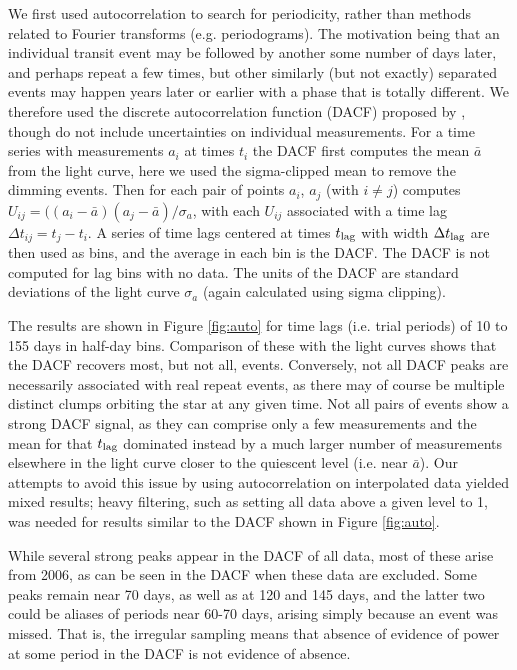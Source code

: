 \documentclass[]{rsos}
\begin{document}
We first used autocorrelation to search for periodicity, rather than methods related to
Fourier transforms (e.g. periodograms). The motivation being that an individual transit
event may be followed by another some number of days later, and perhaps repeat a few
times, but other similarly (but not exactly) separated events may happen years later or
earlier with a phase that is totally different. We therefore used the discrete
autocorrelation function (DACF) proposed by \cite{1988ApJ...333..646E}, though do not
include uncertainties on individual measurements. For a time series with measurements
$a_i$ at times $t_i$ the DACF first computes the mean $\bar{a}$ from the light curve,
here we used the sigma-clipped mean to remove the dimming events. Then for each pair of
points $a_i$, $a_j$ (with $i\ne j$) computes
$U_{ij}=((a_i-\bar{a})(a_j-\bar{a}) / \sigma_a$, with each $U_{ij}$ associated with a
time lag $\Delta t_{ij}=t_j - t_i$. A series of time lags centered at times $t_{\rm lag}$
with width $\Delta t_{\rm lag}$ are then used as bins, and the average in each bin is the
DACF. The DACF is not computed for lag bins with no data. The units of the DACF are
standard deviations of the light curve $\sigma_a$ (again calculated using sigma
clipping).

The results are shown in Figure \ref{fig:auto} for time lags (i.e. trial periods) of 10
to 155 days in half-day bins. Comparison of these with the light curves shows that the
DACF recovers most, but not all, events. Conversely, not all DACF peaks are necessarily
associated with real repeat events, as there may of course be multiple distinct clumps
orbiting the star at any given time. Not all pairs of events show a strong DACF signal,
as they can comprise only a few measurements and the mean for that $t_{\rm lag}$
dominated instead by a much larger number of measurements elsewhere in the light curve
closer to the quiescent level (i.e. near $\bar{a}$). Our attempts to avoid this issue by
using autocorrelation on interpolated data yielded mixed results; heavy filtering, such
as setting all data above a given level to 1, was needed for results similar to the DACF
shown in Figure \ref{fig:auto}.

While several strong peaks appear in the DACF of all data, most of these arise from 2006,
as can be seen in the DACF when these data are excluded. Some peaks remain near 70 days,
as well as at 120 and 145 days, and the latter two could be aliases of periods near 60-70
days, arising simply because an event was missed. That is, the irregular sampling means
that absence of evidence of power at some period in the DACF is not evidence of absence.
\end{document}
